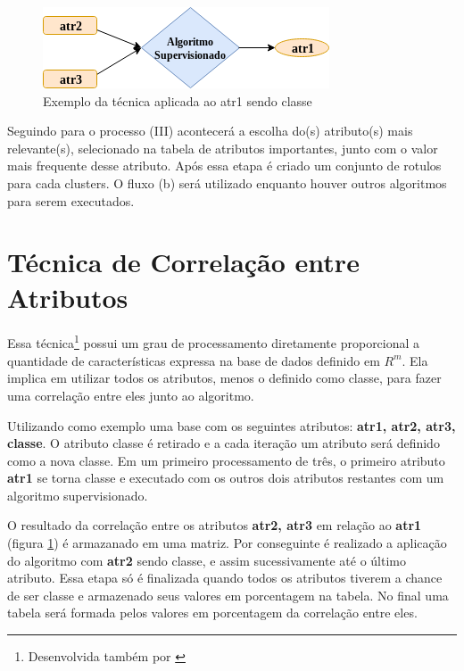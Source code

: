 \begin{figure}[h!]
        \centering
        \includegraphics[scale=0.7]{figs/tecnicamodelo.png}
        \caption{Exemplo da técnica aplicada ao atr1 sendo classe } \label{fig:tecnicamodelo}
\end{figure}

Seguindo para o processo (III) acontecerá a escolha do(s) atributo(s) mais relevante(s), selecionado na tabela de atributos importantes, junto com o valor mais frequente desse atributo. Após essa etapa é criado um conjunto de rotulos para cada clusters. O fluxo (b) será utilizado enquanto houver outros algoritmos para serem executados.

\section{Técnica de Correlação entre Atributos }\label{cap:ferramentas:sec:tecnica}

Essa técnica\footnote{Desenvolvida também por \cite{LOPES2014}} possui um grau de processamento diretamente proporcional a quantidade de características expressa na base de dados definido em ${R^m}$. Ela implica em utilizar todos os atributos, menos o definido como classe, para fazer uma correlação entre eles junto ao algoritmo.


Utilizando como exemplo uma base com os seguintes atributos: \textbf{atr1, atr2, atr3, classe}. O atributo classe é retirado e a cada iteração um atributo será definido como a nova classe. Em um primeiro processamento de três, o primeiro atributo \textbf{atr1} se torna classe e executado com os outros dois atributos restantes com um algoritmo supervisionado. 

O resultado da correlação entre os atributos \textbf{atr2, atr3} em relação ao \textbf{atr1} (figura \ref{fig:tecnicamodelo}) é armazanado em uma matriz. Por conseguinte é realizado a aplicação do algoritmo com \textbf{atr2} sendo classe, e assim sucessivamente até o último atributo. Essa etapa só é finalizada quando todos os atributos tiverem a chance de ser classe e armazenado seus valores em porcentagem na tabela. No final uma tabela será formada pelos valores em porcentagem  da correlação entre eles.



